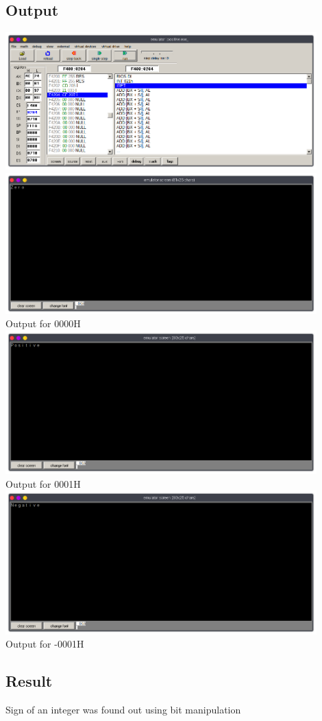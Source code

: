 \subsection{Output}
\begin{center}
	\includegraphics[width=0.90\textwidth]{img/p14/ss1.png}
	\includegraphics[width=0.90\textwidth]{img/p14/ss2.png}\\
	Output for 0000H\\

	\includegraphics[width=0.90\textwidth]{img/p14/ss3.png}\\
	Output for 0001H\\

	\includegraphics[width=0.90\textwidth]{img/p14/ss4.png}\\
	Output for -0001H
\end{center}

\subsection{Result}
Sign of an integer was found out using bit manipulation

